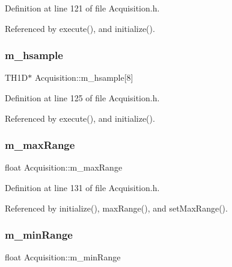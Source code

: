 Definition at line 121 of file Acquisition.\+h.



Referenced by execute(), and initialize().

\mbox{\label{classAcquisition_a53bcc000575de30eba6b7db8209be2cc}} 
\subsubsection{\texorpdfstring{m\+\_\+hsample}{m\_hsample}}
{\footnotesize\ttfamily T\+H1D$\ast$ Acquisition\+::m\+\_\+hsample\mbox{[}8\mbox{]}\hspace{0.3cm}{\ttfamily [private]}}



Definition at line 125 of file Acquisition.\+h.



Referenced by execute(), and initialize().

\mbox{\label{classAcquisition_a45478629e9db582470b4b158edb46616}} 
\subsubsection{\texorpdfstring{m\+\_\+max\+Range}{m\_maxRange}}
{\footnotesize\ttfamily float Acquisition\+::m\+\_\+max\+Range\hspace{0.3cm}{\ttfamily [private]}}



Definition at line 131 of file Acquisition.\+h.



Referenced by initialize(), max\+Range(), and set\+Max\+Range().

\mbox{\label{classAcquisition_a06b3ea027ebdcb15f64a6517ceb99b76}} 
\subsubsection{\texorpdfstring{m\+\_\+min\+Range}{m\_minRange}}
{\footnotesize\ttfamily float Acquisition\+::m\+\_\+min\+Range\hspace{0.3cm}{\ttfamily [private]}}



